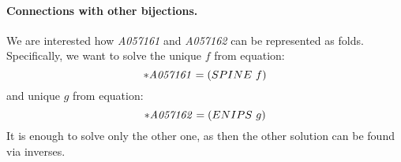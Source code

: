 \documentclass[11pt]{article} %
\newcommand{\eqn}[1]{(\ref{#1})}
\newcommand{\eeq}{\end{equation}}
\newcommand{\beql}[1]{\begin{equation}\label{#1}}
\newcommand{\autname}[1]{{\it *#1}}
\newcommand{\funapply}{\ensuremath{\circ}}
\begin{document}




\paragraph{Connections with other bijections.}

We are interested how \autname{A057161} and  \autname{A057162} can be
represented as folds. Specifically, we want to solve the unique $f$ from
equation:
\beql{A057161_as_SPINE_p1}
\autname{A057161} = (SPINE~f)
\eeq
and unique $g$ from equation:
\beql{A057162_as_ENIPS_p1}
\autname{A057162} = (ENIPS~g)
\eeq
It is enough to solve only the other one, as then the other solution
can be found via inverses.




\end{document}
